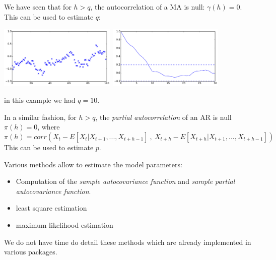 \documentclass{beamer}
\begin{document}
\begin{frame}{}
We have seen that for $h>q$, the autocorrelation of a MA is null: $\gamma(h)=0$. This can be used to estimate $q$: 
\begin{center}
\includegraphics[height=3cm]{figures/1_mab}
\includegraphics[height=3cm]{figures/1_mabEstQ}
\end{center}
in this example we had $q=10$.
\end{frame}

\begin{frame}{}
In a similar fashion, for $h>q$, the \emph{partial autocorrelation} of an AR is null $\pi(h)=0$, where
\small
\begin{equation*}
	\pi(h) = corr(X_{t} - E[X_{t}|X_{t+1},...,X_{t+h-1}] \ , \ X_{t+h} - E[X_{t+h}|X_{t+1},...,X_{t+h-1}])
\end{equation*}
\normalsize
This can be used to estimate $p$.
\end{frame}

\begin{frame}{}
Various methods allow to estimate the model parameters:
\begin{itemize}
	\item Computation of the \emph{sample autocovariance function} and \emph{sample partial autocovariance function}.
	\item least square estimation
	\item maximum likelihood estimation
\end{itemize}
We do not have time do detail these methods which are already implemented in various packages.
\end{frame}


\end{document}
